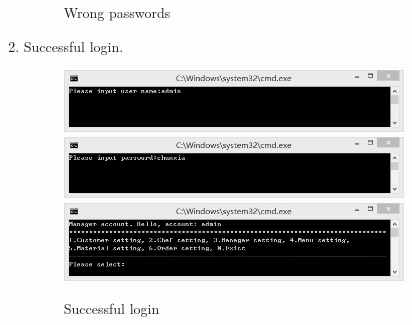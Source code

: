 \documentclass{article}
\begin{document}
\begin{enumerate}
\begin{figure}[H]
        \caption{Wrong passwords}
        \end{figure}
    \item Successful login.
        \begin{figure}[H]
        \centering
        \includegraphics[width=0.85\textwidth]{login/23a.jpg}
        \includegraphics[width=0.85\textwidth]{login/23b.jpg}
        \includegraphics[width=0.85\textwidth]{login/23c.jpg}
        \caption{Successful login}
        \end{figure}
\end{enumerate}
\end{document}
